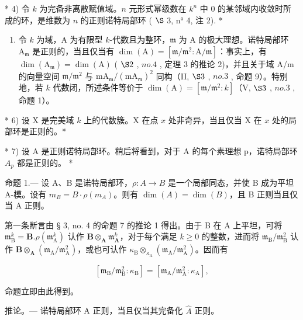 * 4) 令 \(k\) 为完备非离散赋值域。\(n\) 元形式幂级数在 \(k^n\) 中 0 的某邻域内收敛时所成的环，是维数为 \(n\) 的正则诺特局部环 ( \(\S\) 3, n° 4, 注 2). *

\begin{enumerate}
\def\labelenumi{\arabic{enumi})}
\setcounter{enumi}{4}
\tightlist
\item
  令 \(k\) 为域，A 为有限型 \(k\)-代数且为整环，\(\mathfrak{m}\) 为 A 的极大理想。诺特局部环 \(\mathrm{A}_{\mathfrak{m}}\) 是正则的，当且仅当有 \(\dim(\mathrm{A}) = [\mathfrak{m}/\mathfrak{m}^{2}:\mathrm{A}/\mathfrak{m}]\)：事实上，有 \(\dim(\mathrm{A}_{\mathfrak{m}}) = \dim(\mathrm{A})\) ( \(\S 2\) , \(no. 4\) , 定理 3 的推论 2)，并且关于域 A/m 的向量空间 \(\mathfrak{m}/\mathfrak{m}^{2}\) 与 \(\mathrm{mA}_{\mathfrak{m}}/(\mathrm{mA}_{\mathfrak{m}})^{2}\) 同构（II, \(\S 3\) , \(no. 3\) , 命题 9）。特别地，若 \(k\) 代数闭，所述条件等价于 \(\dim(\mathrm{A}) = [\mathfrak{m}/\mathfrak{m}^{2}:k]\)（V, \(\S 3\) , \(no. 3\) , 命题 1）。
\end{enumerate}

* 6) 设 X 是完美域 \(k\) 上的代数簇。X 在点 \(x\) 处非奇异，当且仅当 X 在 \(x\) 处的局部环是正则的。*

* 7) 设 A 是正则诺特局部环。稍后将看到，对于 A 的每个素理想 p，诺特局部环 \(A_{p}\) 都是正则的。 *

命题 1.--- 设 A、B 是诺特局部环，\(\rho:A\to B\) 是一个局部同态，并使 B 成为平坦 A-模。设有 \(m_{B} = B \cdot \rho(m_{A})\)。则有 \(\dim(A) = \dim(B)\)，且 B 正则当且仅当 A 正则。

第一条断言由 § 3, no. 4 的命题 7 的推论 1 得出。由于 B 在 A 上平坦，可将 \(\mathfrak{m}_{\mathrm{B}}^{k} = \mathbf{B}.\rho (\mathfrak{m}_{\mathrm{A}}^{k})\) 认作 \(\mathbf{B}\otimes_{\mathbf{A}}\mathfrak{m}_{\mathbf{A}}^{k}\)，对于每个满足 \(k\geqslant 0\) 的整数，进而将 \(\mathfrak{m}_{\mathrm{B}} / \mathfrak{m}_{\mathrm{B}}^{2}\) 认作 \(\mathbf{B}\otimes_{\mathbf{A}}(\mathfrak{m}_{\mathrm{A}} / \mathfrak{m}_{\mathrm{A}}^{2})\)，或也可认作 \(\kappa_{\mathrm{B}}\otimes_{\kappa_{\mathrm{A}}}(\mathfrak{m}_{\mathrm{A}} / \mathfrak{m}_{\mathrm{A}}^{2})\)。因而有

\[
\left[ \mathfrak {m} _ {\mathrm{B}} / \mathfrak {m} _ {\mathrm{B}} ^ {2}: \kappa_ {\mathrm{B}} \right] = \left[ \mathfrak {m} _ {\mathrm{A}} / \mathfrak {m} _ {\mathrm{A}} ^ {2}: \kappa_ {\mathrm{A}} \right],\tag{2}
\]

命题立即由此得到。

推论。--- 诺特局部环 A 正则，当且仅当其完备化 \(\hat{A}\) 正则。


